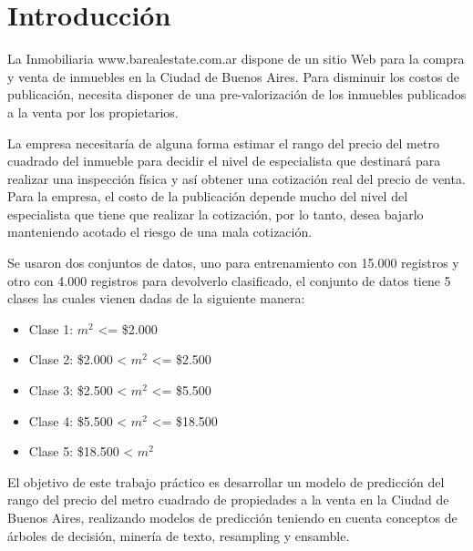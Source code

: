 \section{Introducción}

La Inmobiliaria www.barealestate.com.ar dispone de un sitio Web para la compra y
venta de inmuebles en la Ciudad de Buenos Aires. Para disminuir los costos de
publicación, necesita disponer de una pre-valorización de los inmuebles publicados a la
venta por los propietarios.

La empresa necesitaría de alguna forma estimar el rango del precio del metro cuadrado del
inmueble para decidir el nivel de especialista que destinará para realizar una
inspección física y así obtener una cotización real del precio de venta. Para la
empresa, el costo de la publicación depende mucho del nivel del especialista que tiene
que realizar la cotización, por lo tanto, desea bajarlo manteniendo acotado el riesgo de
una mala cotización.

Se usaron dos conjuntos de datos, uno para entrenamiento con 15.000 registros y otro con 4.000 registros para devolverlo clasificado, 
el conjunto de datos tiene 5 clases las cuales vienen dadas de la siguiente manera:

\begin{itemize}
 \item Clase 1: $m^2$ <= \$2.000
 \item Clase 2: \$2.000 < $m^2$ <= \$2.500
 \item Clase 3: \$2.500 < $m^2$ <= \$5.500
 \item Clase 4: \$5.500 < $m^2$ <= \$18.500
 \item Clase 5: \$18.500 < $m^2$
\end{itemize}

El objetivo de este trabajo práctico es desarrollar un modelo de predicción del rango
del precio del metro cuadrado de propiedades a la venta en la Ciudad de Buenos Aires, realizando
modelos de predicción teniendo en cuenta conceptos de árboles de decisión, minería de texto,
resampling y ensamble.
